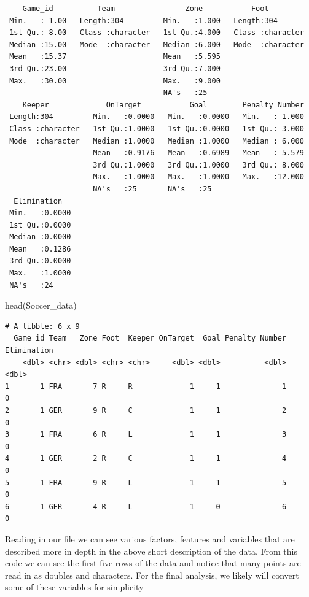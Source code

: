 \documentclass[
  letterpaper,
  DIV=11,
  numbers=noendperiod]{scrartcl}
\newenvironment{Shaded}{\begin{snugshade}}{\end{snugshade}}
\newcommand{\FunctionTok}[1]{\textcolor[rgb]{0.28,0.35,0.67}{#1}}
\newcommand{\NormalTok}[1]{\textcolor[rgb]{0.00,0.23,0.31}{#1}}
\begin{document}
\begin{verbatim}
    Game_id          Team                Zone           Foot          
 Min.   : 1.00   Length:304         Min.   :1.000   Length:304        
 1st Qu.: 8.00   Class :character   1st Qu.:4.000   Class :character  
 Median :15.00   Mode  :character   Median :6.000   Mode  :character  
 Mean   :15.37                      Mean   :5.595                     
 3rd Qu.:23.00                      3rd Qu.:7.000                     
 Max.   :30.00                      Max.   :9.000                     
                                    NA's   :25                        
    Keeper             OnTarget           Goal        Penalty_Number  
 Length:304         Min.   :0.0000   Min.   :0.0000   Min.   : 1.000  
 Class :character   1st Qu.:1.0000   1st Qu.:0.0000   1st Qu.: 3.000  
 Mode  :character   Median :1.0000   Median :1.0000   Median : 6.000  
                    Mean   :0.9176   Mean   :0.6989   Mean   : 5.579  
                    3rd Qu.:1.0000   3rd Qu.:1.0000   3rd Qu.: 8.000  
                    Max.   :1.0000   Max.   :1.0000   Max.   :12.000  
                    NA's   :25       NA's   :25                       
  Elimination    
 Min.   :0.0000  
 1st Qu.:0.0000  
 Median :0.0000  
 Mean   :0.1286  
 3rd Qu.:0.0000  
 Max.   :1.0000  
 NA's   :24      
\end{verbatim}

\begin{Shaded}
\begin{Highlighting}[]
\FunctionTok{head}\NormalTok{(Soccer\_data)}
\end{Highlighting}
\end{Shaded}

\begin{verbatim}
# A tibble: 6 x 9
  Game_id Team   Zone Foot  Keeper OnTarget  Goal Penalty_Number Elimination
    <dbl> <chr> <dbl> <chr> <chr>     <dbl> <dbl>          <dbl>       <dbl>
1       1 FRA       7 R     R             1     1              1           0
2       1 GER       9 R     C             1     1              2           0
3       1 FRA       6 R     L             1     1              3           0
4       1 GER       2 R     C             1     1              4           0
5       1 FRA       9 R     L             1     1              5           0
6       1 GER       4 R     L             1     0              6           0
\end{verbatim}

Reading in our file we can see various factors, features and variables
that are described more in depth in the above short description of the
data. From this code we can see the first five rows of the data and
notice that many points are read in as doubles and characters. For the
final analysis, we likely will convert some of these variables for
simplicity
\end{document}
